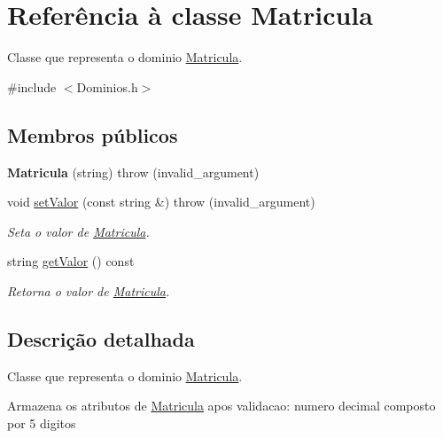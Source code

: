 \hypertarget{class_matricula}{
\section{\-Referência à classe \-Matricula}
\label{class_matricula}
}


\-Classe que representa o dominio \hyperlink{class_matricula}{\-Matricula}.  




{\ttfamily \#include $<$\-Dominios.\-h$>$}

\subsection*{\-Membros públicos}
\begin{DoxyCompactItemize}
\item 
\hypertarget{class_matricula_ad0e207a892bf8ae631a9374d9998996c}{
{\bfseries \-Matricula} (string)  throw (invalid\-\_\-argument)}
\label{class_matricula_ad0e207a892bf8ae631a9374d9998996c}

\item 
void \hyperlink{class_matricula_a0b767fcc96039728967640a19683aecd}{set\-Valor} (const string \&)  throw (invalid\-\_\-argument)
\begin{DoxyCompactList}\small\item\em \-Seta o valor de \hyperlink{class_matricula}{\-Matricula}. \end{DoxyCompactList}\item 
string \hyperlink{class_matricula_a5be68782efe39d296add81af1f4a8cc2}{get\-Valor} () const 
\begin{DoxyCompactList}\small\item\em \-Retorna o valor de \hyperlink{class_matricula}{\-Matricula}. \end{DoxyCompactList}\end{DoxyCompactItemize}


\subsection{\-Descrição detalhada}
\-Classe que representa o dominio \hyperlink{class_matricula}{\-Matricula}. 

\-Armazena os atributos de \hyperlink{class_matricula}{\-Matricula} apos validacao\-: numero decimal composto por 5 digitos 


